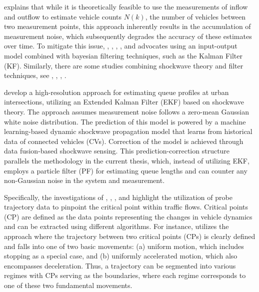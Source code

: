 \textcite{vigos2008real} explains that while it is theoretically feasible to use the measurements of inflow and outflow to estimate vehicle counts \(N(k)\), the number of vehicles between two measurement points, this approach inherently results in the accumulation of measurement noise, which subsequently degrades the accuracy of these estimates over time. To mitigate this issue, \textcite{lee2015real}, \textcite{vigos2008real}, \textcite{vigos2010simplified}, \textcite{aljamal2020real}, \textcite{wang2021kalman} and \textcite{anusha2022dynamical} advocates using an input-output model combined with bayesian filtering techniques, such as the Kalman Filter (KF). Similarly, there are some studies combining shockwave theory and filter techniques, see \textcite{yin2018kalman}, \textcite{abewickrema2023multivariate}, \textcite{ferencz2023road}, \textcite{hu2022high}. 

\textcite{hu2022high} develop a high-resolution approach for estimating queue profiles at urban intersections, utilizing an Extended Kalman Filter (EKF) based on shockwave theory. The approach assumes measurement noise follows a zero-mean Gaussian white noise distribution. The prediction of this model is powered by a machine learning-based dynamic shockwave propagation model that learns from historical data of connected vehicles (CVs). Correction of the model is achieved through data fusion-based shockwave sensing. This prediction-correction structure parallels the methodology in the current thesis, which, instead of utilizing EKF, employs a particle filter (PF) for estimating queue lengths and can counter any non-Gaussian noise in the system and measurement.

Specifically, the investigations of \textcite{wang2015cycle}, \textcite{cheng2012exploratory}, \textcite{cai2014shock}, and \textcite{cheng2011cycle} highlight the utilization of probe trajectory data to pinpoint the critical point within traffic flows. Critical points (CP) are defined as the data points representing the changes in vehicle dynamics and can be extracted using different algorithms. For instance, \textcite{cheng2012exploratory} utilizes the approach where the trajectory between two critical points (CPs) is clearly defined and falls into one of two basic movements: (a) uniform motion, which includes stopping as a special case, and (b) uniformly accelerated motion, which also encompasses deceleration. Thus, a trajectory can be segmented into various regimes with CPs serving as the boundaries, where each regime corresponds to one of these two fundamental movements.


